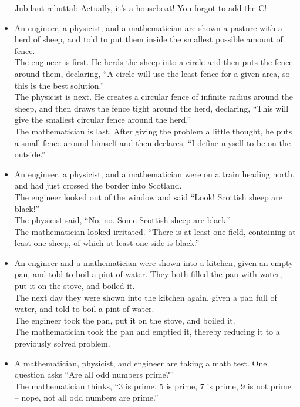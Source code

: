 \begin{itemize}
  Jubilant rebuttal: Actually, it's a houseboat! You forgot to add the C!
 \item
  An engineer, a physicist, and a mathematician are shown a pasture with a herd
  of sheep, and told to put them inside the smallest possible amount of fence.
  \\
  The engineer is first. He herds the sheep into a circle and then puts the
  fence around them, declaring, ``A circle will use the least fence for a given
  area, so this is the best solution.'' \\
  The physicist is next. He creates a circular fence of infinite radius around
  the sheep, and then draws the fence tight around the herd, declaring, ``This
  will give the smallest circular fence around the herd.'' \\
  The mathematician is last. After giving the problem a little thought, he puts
  a small fence around himself and then declares, ``I define myself to be on the
  outside.''
 \item
  An engineer, a physicist, and a mathematician were on a train heading north,
  and had just crossed the border into Scotland. \\
  The engineer looked out of the window and said ``Look! Scottish sheep are
  black!'' \\
  The physicist said, ``No, no. Some Scottish sheep are black.'' \\
  The mathematician looked irritated. ``There is at least one field, containing
  at least one sheep, of which at least one side is black.'' \\
 \item
  An engineer and a mathematician were shown into a kitchen, given an empty pan,
  and told to boil a pint of water. They both filled the pan with water, put it
  on the stove, and boiled it. \\
  The next day they were shown into the kitchen again, given a pan full of
  water, and told to boil a pint of water. \\
  The engineer took the pan, put it on the stove, and boiled it. \\
  The mathematician took the pan and emptied it, thereby reducing it to a
  previously solved problem.
 \item
  A mathematician, physicist, and engineer are taking a math test. One question
  asks ``Are all odd numbers prime?'' \\
  The mathematician thinks, ``3 is prime, 5 is prime, 7 is prime, 9 is not prime
  -- nope, not all odd numbers are prime.'' \\

\end{itemize}
